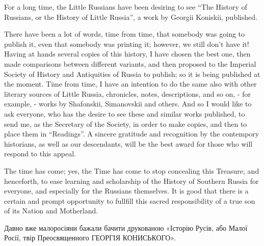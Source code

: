  
 
 
 
 

\begin{zznagolos}
\raggedcolumns
\begin{multicols}{2} %
\setlength{\parindent}{0pt}

For a long time, the Little Russians have been desiring to see \enquote{The History of
Russians, or the History of Little Russia}, a work by Georgii Koniskii, published.

There have been a lot of words, time from time, that somebody was going to
publish it, even that somebody was printing it; however, we still don't have
it!  Having at hands several copies of this history, I have chosen the best
one, then made comparisons between different variants, and then proposed to the
Imperial Society of History and Antiquities of Russia to publish; so it is
being published at the moment. Time from time, I have an intention to do the
same also with other literary sources of Little Russia, chronicles, notes,
descriptions, and so on, - for example, - works by Shafonskii, Simanovskii and
others. And so I would like to ask everyone, who has the desire to see these
and similar works published, to send me, as the Secretary of the Society, in
order to make copies, and then to place them in \enquote{Readings}. A sincere
gratitude and recognition by the contempory historians, as well as our
descendants, will be the best award for those who will respond to this appeal.

The time has come; yes, the Time has come to stop concealing this Treasure, and
henceforth, to ease learning and scholarship of the History of Southern Russia
for everyone, and especially for the Russians themselves.  It is good that
there is a certain and prompt opportunity to fullfill this sacred
responsibility of a true son of its Nation and Motherland.

Давно вже малоросіяни бажали бачити друкованою «Історію Русів, або Малої Росії,
твір Преосвященного ГЕОРГІЯ КОНИСЬКОГО».


\end{multicols}
\end{zznagolos}
